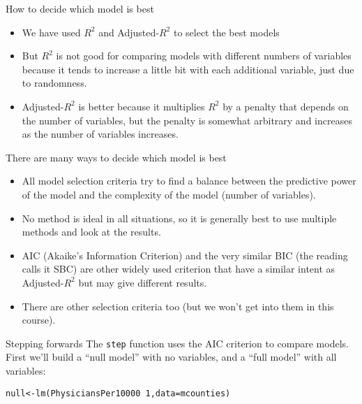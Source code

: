 \documentclass{beamer}\usepackage[]{graphicx}\usepackage[]{color}
\makeatletter
\newcommand{\hlnum}[1]{\textcolor[rgb]{0.824,0.412,0.118}{#1}}%
\newcommand{\hlopt}[1]{\textcolor[rgb]{1,0.894,0.769}{#1}}%
\newcommand{\hlstd}[1]{\textcolor[rgb]{1,0.894,0.769}{#1}}%
\newcommand{\hlkwb}[1]{\textcolor[rgb]{0.804,0.776,0.451}{#1}}%
\newcommand{\hlkwc}[1]{\textcolor[rgb]{0.78,0.941,0.545}{#1}}%
\newcommand{\hlkwd}[1]{\textcolor[rgb]{1,0.78,0.769}{#1}}%
\newenvironment{kframe}{%
 \def\at@end@of@kframe{}%
 \ifinner\ifhmode%
  \def\at@end@of@kframe{\end{minipage}}%
  \begin{minipage}{\columnwidth}%
 \fi\fi%
 \def\FrameCommand##1{\hskip\@totalleftmargin \hskip-\fboxsep
 \colorbox{shadecolor}{##1}\hskip-\fboxsep
     \hskip-\linewidth \hskip-\@totalleftmargin \hskip\columnwidth}%
 \MakeFramed {\advance\hsize-\width
   \@totalleftmargin\z@ \linewidth\hsize
   \@setminipage}}%
 {\par\unskip\endMakeFramed%
 \at@end@of@kframe}
\newenvironment{knitrout}{}{} %
\makeatother
\begin{document}
\begin{darkframes}
    \begin{frame}{How to decide which model is best}
      \begin{itemize}[<+->]
        \item We have used $R^2$ and Adjusted-$R^2$ to select the best models
        \item But $R^2$ is not good for comparing models with different numbers of variables because it tends to increase a little bit with each additional variable, just due to randomness.
        \item Adjusted-$R^2$ is better because it multiplies $R^2$ by a penalty that depends on the number of variables, but the penalty is somewhat arbitrary and increases as the number of variables increases.
      \end{itemize}
    \end{frame}


    \begin{frame}{There are many ways to decide which model is best}
      \begin{itemize}[<+->]
        \item All model selection criteria try to find a balance between the \alert{predictive power of the model} and the \alert{complexity of the model} (number of variables).
        \item No method is ideal in all situations, so it is generally best to use multiple methods and look at the results.
        \item AIC (Akaike's Information Criterion) and the very similar BIC (the reading calls it SBC) are other widely used criterion that have a similar intent as Adjusted-$R^2$ but may give different results.
        \item There are other selection criteria too (but we won't get into them in this course).
      \end{itemize}
    \end{frame}

    \begin{frame}[fragile]{Stepping forwards}
       The \texttt{step} function uses the AIC criterion to compare models. First we'll build a ``null model'' with no variables, and a ``full model'' with all variables:

      \fontsize{9}{9}\selectfont
\begin{knitrout}
\begin{kframe}
\begin{alltt}
\hlstd{null} \hlkwb{<-} \hlkwd{lm}\hlstd{(PhysiciansPer10000} \hlopt{~} \hlnum{1}\hlstd{,} \hlkwc{data}\hlstd{=mcounties)}


\end{alltt}
\end{kframe}
\end{knitrout}
\end{frame}
\end{darkframes}
\end{document}
